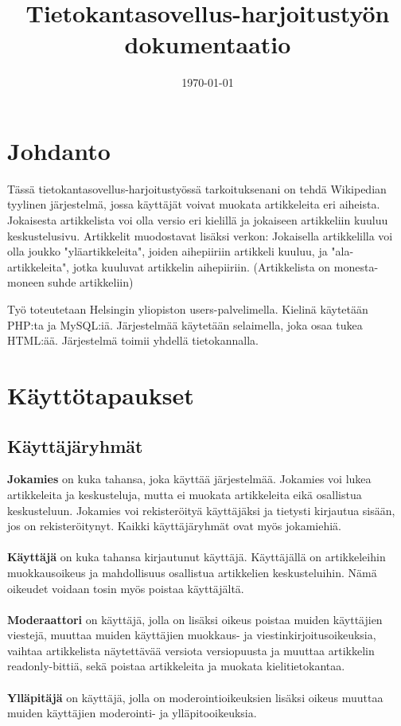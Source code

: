 \documentclass[12pt]{article}
\title{Tietokantasovellus-harjoitustyön dokumentaatio}
\date{\today}
\begin{document}
  \maketitle
  \newpage
  \tableofcontents
  \newpage

  \section{Johdanto}
    Tässä tietokantasovellus-harjoitustyössä tarkoituksenani on tehdä Wikipedian tyylinen järjestelmä, jossa käyttäjät voivat muokata artikkeleita eri aiheista. Jokaisesta artikkelista voi olla versio eri kielillä ja jokaiseen artikkeliin kuuluu keskustelusivu. Artikkelit muodostavat lisäksi verkon: Jokaisella artikkelilla voi olla joukko "yläartikkeleita", joiden aihepiiriin artikkeli kuuluu, ja "ala-artikkeleita", jotka kuuluvat artikkelin aihepiiriin. (Artikkelista on monesta-moneen suhde artikkeliin)

    Työ toteutetaan Helsingin yliopiston users-palvelimella. Kielinä käytetään PHP:ta ja MySQL:iä. Järjestelmää käytetään selaimella, joka osaa tukea HTML:ää. Järjestelmä toimii yhdellä tietokannalla.
  \newpage

  \section{Käyttötapaukset}
    \subsection{Käyttäjäryhmät}
      \textbf{Jokamies} on kuka tahansa, joka käyttää järjestelmää. Jokamies voi lukea artikkeleita ja keskusteluja, mutta ei muokata artikkeleita eikä osallistua keskusteluun. Jokamies voi rekisteröityä käyttäjäksi ja tietysti kirjautua sisään, jos on rekisteröitynyt. Kaikki käyttäjäryhmät ovat myös jokamiehiä.\\ \\
      \textbf{Käyttäjä} on kuka tahansa kirjautunut käyttäjä. Käyttäjällä on artikkeleihin muokkausoikeus ja mahdollisuus osallistua artikkelien keskusteluihin. Nämä oikeudet voidaan tosin myös poistaa käyttäjältä. \\ \\
      \textbf{Moderaattori} on käyttäjä, jolla on lisäksi oikeus poistaa muiden käyttäjien viestejä, muuttaa muiden käyttäjien muokkaus- ja viestinkirjoitusoikeuksia, vaihtaa artikkelista näytettävää versiota versiopuusta ja muuttaa artikkelin readonly-bittiä, sekä poistaa artikkeleita ja muokata kielitietokantaa. \\ \\
      \textbf{Ylläpitäjä} on käyttäjä, jolla on moderointioikeuksien lisäksi oikeus muuttaa muiden käyttäjien moderointi- ja ylläpitooikeuksia.
\end{document}

